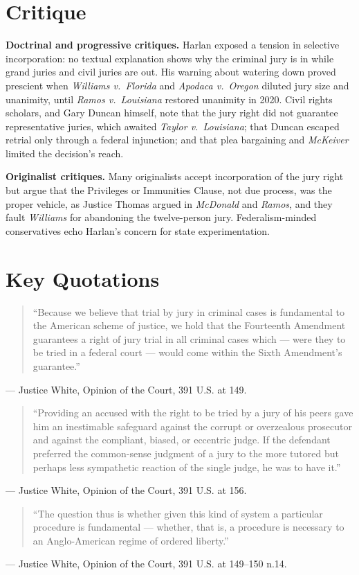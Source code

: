 \documentclass[12pt]{article}
\begin{document}
\section{Critique}

\textbf{Doctrinal and progressive critiques.} Harlan exposed a tension in selective incorporation: no textual explanation shows why the criminal jury is in while grand juries and civil juries are out. His warning about watering down proved prescient when \textit{Williams v.\ Florida} and \textit{Apodaca v.\ Oregon} diluted jury size and unanimity, until \textit{Ramos v.\ Louisiana} restored unanimity in 2020. Civil rights scholars, and Gary Duncan himself, note that the jury right did not guarantee representative juries, which awaited \textit{Taylor v.\ Louisiana}; that Duncan escaped retrial only through a federal injunction; and that plea bargaining and \textit{McKeiver} limited the decision's reach.

\textbf{Originalist critiques.} Many originalists accept incorporation of the jury right but argue that the Privileges or Immunities Clause, not due process, was the proper vehicle, as Justice Thomas argued in \textit{McDonald} and \textit{Ramos}, and they fault \textit{Williams} for abandoning the twelve-person jury. Federalism-minded conservatives echo Harlan's concern for state experimentation.

\section{Key Quotations}

\begin{quote}
``Because we believe that trial by jury in criminal cases is fundamental to the American scheme of justice, we hold that the Fourteenth Amendment guarantees a right of jury trial in all criminal cases which --- were they to be tried in a federal court --- would come within the Sixth Amendment's guarantee.''
\end{quote}
\noindent --- Justice White, Opinion of the Court, 391 U.S. at 149.

\begin{quote}
``Providing an accused with the right to be tried by a jury of his peers gave him an inestimable safeguard against the corrupt or overzealous prosecutor and against the compliant, biased, or eccentric judge. If the defendant preferred the common-sense judgment of a jury to the more tutored but perhaps less sympathetic reaction of the single judge, he was to have it.''
\end{quote}
\noindent --- Justice White, Opinion of the Court, 391 U.S. at 156.

\begin{quote}
``The question thus is whether given this kind of system a particular procedure is fundamental --- whether, that is, a procedure is necessary to an Anglo-American regime of ordered liberty.''
\end{quote}
\noindent --- Justice White, Opinion of the Court, 391 U.S. at 149--150 n.14.
\end{document}
